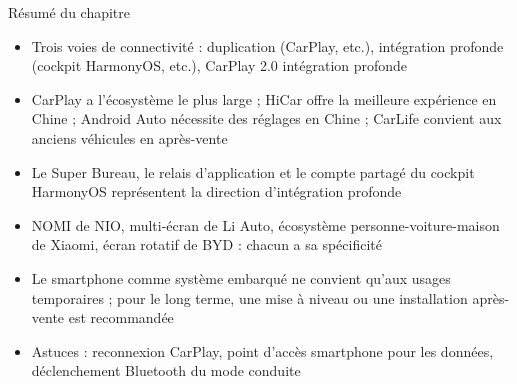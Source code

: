 \begin{tcbsummary}{Résumé du chapitre}
\begin{itemize}
  \item Trois voies de connectivité : duplication (CarPlay, etc.), intégration profonde (cockpit HarmonyOS, etc.), CarPlay 2.0 intégration profonde
  \item CarPlay a l'écosystème le plus large ; HiCar offre la meilleure expérience en Chine ; Android Auto nécessite des réglages en Chine ; CarLife convient aux anciens véhicules en après-vente
  \item Le Super Bureau, le relais d'application et le compte partagé du cockpit HarmonyOS représentent la direction d'intégration profonde
  \item NOMI de NIO, multi-écran de Li Auto, écosystème personne-voiture-maison de Xiaomi, écran rotatif de BYD : chacun a sa spécificité
  \item Le smartphone comme système embarqué ne convient qu'aux usages temporaires ; pour le long terme, une mise à niveau ou une installation après-vente est recommandée
  \item Astuces : reconnexion CarPlay, point d'accès smartphone pour les données, déclenchement Bluetooth du mode conduite
\end{itemize}

\end{tcbsummary}
